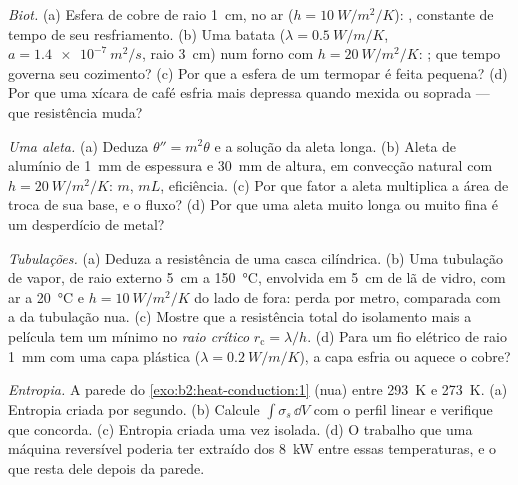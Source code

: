 \begin{exercise}[$\star\star$]\label{exo:b2:heat-conduction:7}
\emph{Biot.} (a) Esfera de cobre de raio \qty{1}{cm}, no ar ($h =
\qty{10}{W/m^2/K}$): , constante de tempo de seu resfriamento. (b) Uma
batata ($\lambda = \qty{0.5}{W/m/K}$, $a = \qty{1.4e-7}{m^2/s}$, raio
\qty{3}{cm}) num forno com $h = \qty{20}{W/m^2/K}$: ; que
tempo governa seu cozimento? (c) Por que a esfera de um termopar é feita pequena?
(d) Por que uma xícara de café esfria mais depressa quando mexida ou soprada ---
que resistência muda?
\end{exercise}

\begin{exercise}[$\star\star$]\label{exo:b2:heat-conduction:8}
\emph{Uma aleta.} (a) Deduza $\theta'' = m^2\theta$ e a solução da aleta longa.
(b) Aleta de alumínio de \qty{1}{mm} de espessura e \qty{30}{mm} de altura, em convecção
natural com $h = \qty{20}{W/m^2/K}$: $m$, $mL$, eficiência. (c) Por que
fator a aleta multiplica a área de troca de sua base, e o
fluxo? (d) Por que uma aleta muito longa ou muito fina é um desperdício de metal?
\end{exercise}

\begin{exercise}[$\star\star$]\label{exo:b2:heat-conduction:9}
\emph{Tubulações.} (a) Deduza a resistência de uma casca cilíndrica. (b) Uma
tubulação de vapor, de raio externo \qty{5}{cm} a \qty{150}{\celsius}, envolvida em
\qty{5}{cm} de lã de vidro, com ar a \qty{20}{\celsius} e $h =
\qty{10}{W/m^2/K}$ do lado de fora: perda por metro, comparada com a da tubulação nua.
(c) Mostre que a resistência total do isolamento mais a película tem um
mínimo no \emph{raio crítico} $r_{\text{c}} = \lambda/h$. (d) Para um
fio elétrico de raio \qty{1}{mm} com uma capa plástica ($\lambda =
\qty{0.2}{W/m/K}$), a capa esfria ou aquece o cobre?
\end{exercise}

\begin{exercise}[$\star\star\star$]\label{exo:b2:heat-conduction:10}
\emph{Entropia.} A parede do \cref{exo:b2:heat-conduction:1} (nua)
entre \qty{293}{K} e \qty{273}{K}. (a) Entropia criada por segundo.
(b) Calcule $\int\sigma_s\,\dd V$ com o perfil linear e verifique que
concorda. (c) Entropia criada uma vez isolada. (d) O trabalho que uma
máquina reversível poderia ter extraído dos \qty{8}{kW} entre
essas temperaturas, e o que resta dele depois da parede.
\end{exercise}

